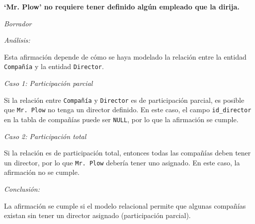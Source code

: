 \textbf{‘Mr. Plow’ no requiere tener definido algún empleado que la dirija.}\vspace{.3cm}


\textit{Borrador}

\textit{Análisis:} 

Esta afirmación depende de cómo se haya modelado la relación entre la entidad \texttt{Compañía} y la entidad \texttt{Director}. 

\textit{Caso 1: Participación parcial}

Si la relación entre \texttt{Compañía} y \texttt{Director} es de participación parcial, es posible que \texttt{Mr. Plow} no tenga un director definido. En este caso, el campo \texttt{id\_director} en la tabla de compañías puede ser \texttt{NULL}, por lo que la afirmación se cumple.

\textit{Caso 2: Participación total}

Si la relación es de participación total, entonces todas las compañías deben tener un director, por lo que \texttt{Mr. Plow} debería tener uno asignado. En este caso, la afirmación no se cumple.

\textit{Conclusión:}

La afirmación se cumple si el modelo relacional permite que algunas compañías existan sin tener un director asignado (participación parcial).